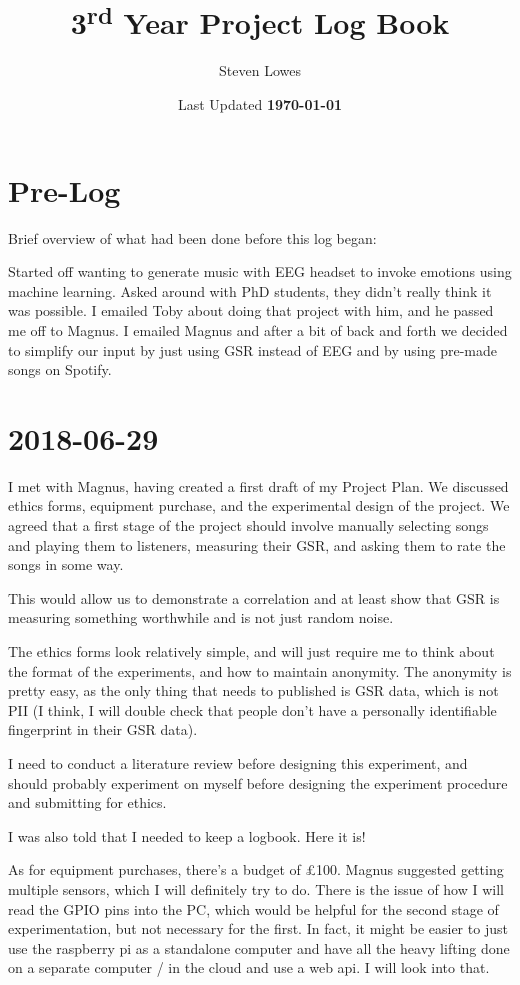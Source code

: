 \documentclass{article}
\title{{\Huge 3\textsuperscript{rd} Year Project Log Book}}
\author{Steven Lowes}
\date{Last Updated \textbf{\today}}
\begin{document}
	\maketitle
	
	\newpage
	
	\tableofcontents
	
	\newpage
	
	\section{Pre-Log}
	Brief overview of what had been done before this log began:
	
	Started off wanting to generate music with EEG headset to invoke emotions using machine learning. Asked around with PhD students, they didn't really think it was possible. I emailed Toby about doing that project with him, and he passed me off to Magnus. I emailed Magnus and after a bit of back and forth we decided to simplify our input by just using GSR instead of EEG and by using pre-made songs on Spotify.
	
	\section{2018-06-29}
	I met with Magnus, having created a first draft of my Project Plan. We discussed ethics forms, equipment purchase, and the experimental design of the project. We agreed that a first stage of the project should involve manually selecting songs and playing them to listeners, measuring their GSR, and asking them to rate the songs in some way.
	
	This would allow us to demonstrate a correlation and at least show that GSR is measuring something worthwhile and is not just random noise.
	
	The ethics forms look relatively simple, and will just require me to think about the format of the experiments, and how to maintain anonymity. The anonymity is pretty easy, as the only thing that needs to published is GSR data, which is not PII (I think, I will double check that people don't have a personally identifiable fingerprint in their GSR data).
	
	I need to conduct a literature review before designing this experiment, and should probably experiment on myself before designing the experiment procedure and submitting for ethics.
	
	I was also told that I needed to keep a logbook. Here it is!
	
	As for equipment purchases, there's a budget of \pounds100. Magnus suggested getting multiple sensors, which I will definitely try to do. There is the issue of how I will read the GPIO pins into the PC, which would be helpful for the second stage of experimentation, but not necessary for the first. In fact, it might be easier to just use the raspberry pi as a standalone computer and have all the heavy lifting done on a separate computer / in the cloud and use a web api. I will look into that.
	
\end{document}
